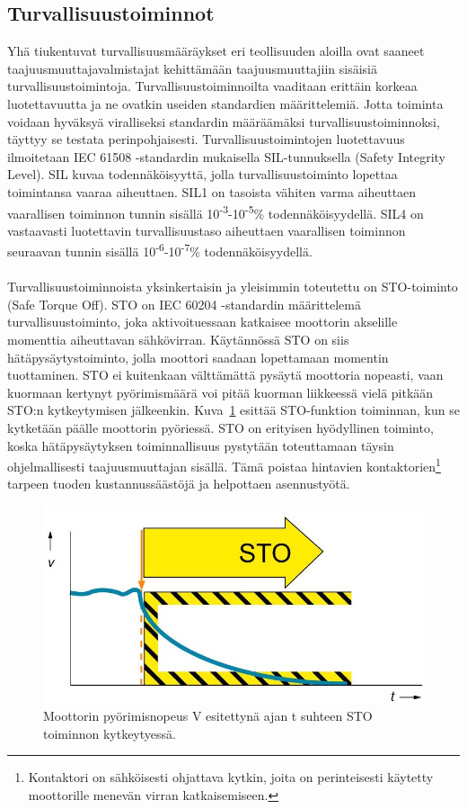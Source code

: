 \documentclass[finnish,12pt,a4paper,pdftex,elec,utf8]{aaltothesis}
\begin{document}
\subsection{Turvallisuustoiminnot}
Yhä tiukentuvat turvallisuusmääräykset eri teollisuuden aloilla ovat saaneet taajuusmuuttajavalmistajat kehittämään taajuusmuuttajiin sisäisiä turvallisuustoimintoja. Turvallisuustoiminnoilta vaaditaan erittäin korkeaa luotettavuutta ja ne ovatkin useiden standardien määrittelemiä. Jotta toiminta voidaan hyväksyä viralliseksi standardin määräämäksi turvallisuustoiminnoksi, täyttyy se testata perinpohjaisesti. Turvallisuustoimintojen luotettavuus ilmoitetaan IEC 61508 -standardin \cite{IEC61508} mukaisella SIL-tunnuksella (Safety Integrity Level). SIL kuvaa todennäköisyyttä, jolla turvallisuustoiminto lopettaa toimintansa vaaraa aiheuttaen. SIL1 on tasoista vähiten varma aiheuttaen vaarallisen toiminnon tunnin sisällä 10\textsuperscript{-3}-10\textsuperscript{-5}\% todennäköisyydellä. SIL4 on vastaavasti luotettavin turvallisuustaso aiheuttaen vaarallisen toiminnon seuraavan tunnin sisällä 10\textsuperscript{-6}-10\textsuperscript{-7}\% todennäköisyydellä.
\\\\
Turvallisuustoiminnoista yksinkertaisin ja yleisimmin toteutettu on STO-toiminto (Safe Torque Off). STO on IEC 60204 -standardin \cite{IEC60204-1} määrittelemä turvallisuustoiminto, joka aktivoituessaan katkaisee moottorin akselille momenttia aiheuttavan sähkövirran. Käytännössä STO on siis hätäpysäytystoiminto, jolla moottori saadaan lopettamaan momentin tuottaminen. STO ei kuitenkaan välttämättä pysäytä moottoria nopeasti, vaan kuormaan kertynyt pyörimismäärä voi pitää kuorman liikkeessä vielä pitkään STO:n kytkeytymisen jälkeenkin. Kuva~\ref{fig:STO} esittää STO-funktion toiminnan, kun se kytketään päälle moottorin pyöriessä. STO on erityisen hyödyllinen toiminto, koska hätäpysäytyksen toiminnallisuus pystytään toteuttamaan täysin ohjelmallisesti taajuusmuuttajan sisällä. Tämä poistaa hintavien kontaktorien\footnote{Kontaktori on sähköisesti ohjattava kytkin, joita on perinteisesti käytetty moottorille menevän virran katkaisemiseen.} tarpeen tuoden kustannussäästöjä ja helpottaen asennustyötä.
\begin{figure}[H]
	\begin{center}
	\includegraphics[scale=0.5]{STO}
	\end{center}
	\caption{Moottorin pyörimisnopeus V esitettynä ajan t suhteen STO toiminnon kytkeytyessä.
		 \cite{STOkuva}}
	\label{fig:STO}
\end{figure}
\end{document}
